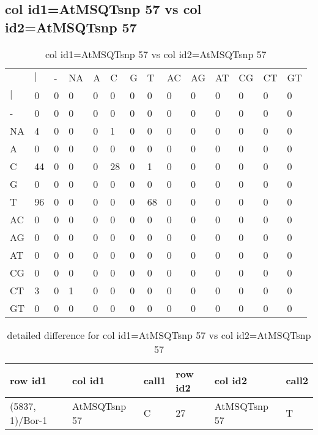 \subsection{col id1=AtMSQTsnp 57 vs col id2=AtMSQTsnp 57}
\begin{center}
\begin{longtable}{|l|l|l|l|l|l|l|l|l|l|l|l|l|l|}
\caption{col id1=AtMSQTsnp 57 vs col id2=AtMSQTsnp 57} \label{table_dm752}\\
\hline
\\
\hline
&$|$&-&NA&A&C&G&T&AC&AG&AT&CG&CT&GT\\
$|$&0&0&0&0&0&0&0&0&0&0&0&0&0\\
-&0&0&0&0&0&0&0&0&0&0&0&0&0\\
NA&4&0&0&0&1&0&0&0&0&0&0&0&0\\
A&0&0&0&0&0&0&0&0&0&0&0&0&0\\
C&44&0&0&0&28&0&1&0&0&0&0&0&0\\
G&0&0&0&0&0&0&0&0&0&0&0&0&0\\
T&96&0&0&0&0&0&68&0&0&0&0&0&0\\
AC&0&0&0&0&0&0&0&0&0&0&0&0&0\\
AG&0&0&0&0&0&0&0&0&0&0&0&0&0\\
AT&0&0&0&0&0&0&0&0&0&0&0&0&0\\
CG&0&0&0&0&0&0&0&0&0&0&0&0&0\\
CT&3&0&1&0&0&0&0&0&0&0&0&0&0\\
GT&0&0&0&0&0&0&0&0&0&0&0&0&0\\
\hline
\end{longtable}
\end{center}

\begin{center}
\begin{longtable}{|l|l|l|l|l|l|}
\caption{detailed difference for col id1=AtMSQTsnp 57 vs col id2=AtMSQTsnp 57} \label{table_dm753}\\
\hline
row id1&col id1&call1&row id2&col id2&call2\\
\hline
(5837, 1)/Bor-1&AtMSQTsnp 57&C&27&AtMSQTsnp 57&T\\
\hline
\end{longtable}
\end{center}


